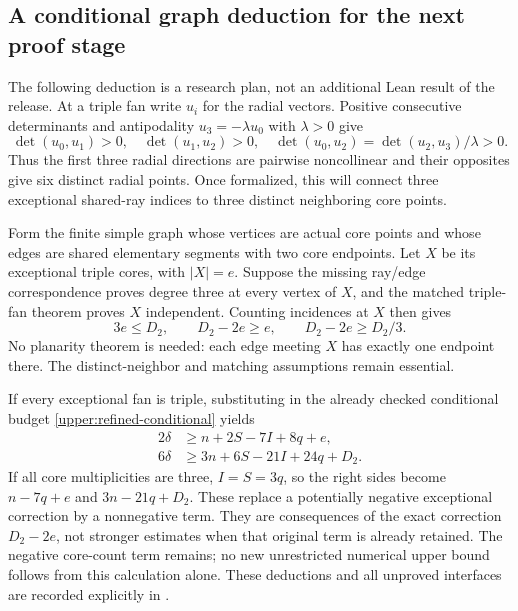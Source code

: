 \subsection{A conditional graph deduction for the next proof stage}
\label{sec:graph-plan}

The following deduction is a research plan, not an additional Lean
result of the release. At a triple fan write $u_i$ for the radial
vectors. Positive consecutive determinants and antipodality
$u_3=-\lambda u_0$ with $\lambda>0$ give
\[
 \det(u_0,u_1)>0,\quad \det(u_1,u_2)>0,\quad
 \det(u_0,u_2)=\det(u_2,u_3)/\lambda>0.
\]
Thus the first three radial directions are pairwise noncollinear and
their opposites give six distinct radial points. Once formalized, this
will connect three exceptional shared-ray indices to three distinct
neighboring core points.

Form the finite simple graph whose vertices are actual core points and
whose edges are shared elementary segments with two core endpoints.
Let $X$ be its exceptional triple cores, with $|X|=e$. Suppose the missing
ray/edge correspondence proves degree three at every vertex of $X$,
and the matched triple-fan theorem proves $X$ independent. Counting
incidences at $X$ then gives
\begin{equation}
 3e\le D_2,\qquad D_2-2e\ge e,\qquad D_2-2e\ge D_2/3.
 \label{discussion:conditional-graph}
\end{equation}
No planarity theorem is needed: each edge meeting $X$ has exactly one
endpoint there. The distinct-neighbor and matching assumptions remain
essential.

If every exceptional fan is triple, substituting in the already checked
conditional budget \eqref{upper:refined-conditional} yields
\begin{align}
 2\delta&\ge n+2S-7I+8q+e,\\
 6\delta&\ge3n+6S-21I+24q+D_2.
 \label{discussion:conditional-defect}
\end{align}
If all core multiplicities are three, $I=S=3q$, so the right sides
become $n-7q+e$ and $3n-21q+D_2$. These replace a potentially negative
exceptional correction by a nonnegative term. They are consequences of
the exact correction $D_2-2e$, not stronger estimates when that original
term is already retained. The negative core-count term remains; no new
unrestricted numerical upper bound follows from this calculation alone.
These deductions and all unproved interfaces are recorded explicitly in
.

